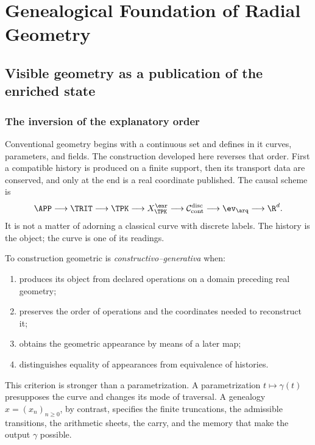 \part{Genealogical Foundation of Radial Geometry}

\chapter{Visible geometry as a publication of the enriched state}

\section{The inversion of the explanatory order}

Conventional geometry begins with a continuous set and defines in it
curves, parameters, and fields. The construction developed here reverses that
order. First a compatible history is produced on a finite support,
then its transport data are conserved, and only at the end is a real
coordinate published. The causal scheme is
\begin{equation}
 \APP\longrightarrow\TRIT\longrightarrow\TPK
 \longrightarrow X_{\TPK}^{\enr}
 \longrightarrow\mathcal C_{\mathrm{cont}}^{\mathrm{disc}}
 \longrightarrow\ev_{\arq}
 \longrightarrow\R^d.
 \label{espiral:eq:cadena-genealogica-espiral}
\end{equation}
It is not a matter of adorning a classical curve with discrete labels. The
history is the object; the curve is one of its readings.

\begin{definition}
To construction geometric is \emph{constructivo--generativa} when:
\begin{enumerate}
\item produces its object from declared operations on a domain
preceding real geometry;
\item preserves the order of operations and the coordinates needed to reconstruct it;
\item obtains the geometric appearance by means of a later map;
\item distinguishes equality of appearances from equivalence of histories.
\end{enumerate}
\end{definition}

This criterion is stronger than a parametrization. A parametrization
\(t\mapsto\gamma(t)\) presupposes the curve and changes its mode of traversal. A
genealogy \(x=(x_n)_{n\ge0}\), by contrast, specifies the finite truncations, the
admissible transitions, the arithmetic sheets, the carry, and the memory
that make the output \(\gamma\) possible.

